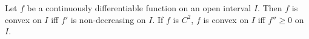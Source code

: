 Let $f$ be a continuously differentiable function on an open interval $I$. Then $f$ is convex on $I$ iff $f'$ is non-decreasing on $I$. If $f$ is $C^2$, $f$ is convex on $I$ iff $f'' \geqslant 0$ on $I$.
